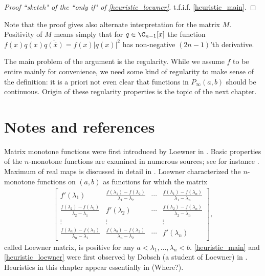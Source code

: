 \begin{proof}[Proof ``sketch" of the ``only if" of \ref{heuristic_loewner}]
	t.f.i.f. \ref{heuristic_main}.
\end{proof}

Note that the proof gives also alternate interpretation for the matrix $M$. Positivity of $M$ means simply that for $q \in \C_{n - 1}[x]$ the function $f(x) q(x) \overline{q(\overline{x})} = f(x) |q(x)|^2$ has non-negative $(2 n - 1)$'th derivative.

The main problem of the argument is the regularity. While we assume $f$ to be entire mainly for convenience, we need some kind of regularity to make sense of the definition: it is a priori not even clear that functions in $P_{\infty}(a, b)$ should be continuous. Origin of these regularity properties is the topic of the next chapter.

\section{Notes and references}

Matrix monotone functions were first introduced by Loewner in \cite{Low}. Basic properties of the $n$-monotone functions are examined in numerous sources; see for instance \cite{Hiai}. Maximum of real maps is discussed in detail in \cite{Ando2}. Loewner characterized the $n$-monotone functions on $(a, b)$ as functions for which the matrix
\begin{align*}
	\begin{bmatrix}
		f'(\lambda_{1}) & \frac{f(\lambda_{1}) - f(\lambda_{2})}{\lambda_{1} - \lambda_{2}} & \cdots & \frac{f(\lambda_{1}) - f(\lambda_{n})}{\lambda_{1} - \lambda_{n}} \\
		\frac{f(\lambda_{2}) - f(\lambda_{1})}{\lambda_{2} - \lambda_{1}} & f'(\lambda_{2}) & \cdots & \frac{f(\lambda_{2}) - f(\lambda_{n})}{\lambda_{2} - \lambda_{n}} \\
		\vdots & \vdots & & \vdots \\
		\frac{f(\lambda_{n}) - f(\lambda_{1})}{\lambda_{n} - \lambda_{1}} & \frac{f(\lambda_{b}) - f(\lambda_{2})}{\lambda_{n} - \lambda_{2}} & \cdots & f'(\lambda_{n}) 
	\end{bmatrix},
\end{align*}
called Loewner matrix, is positive for any $a < \lambda_{1}, \ldots, \lambda_{n} < b$. \ref{heuristic_main} and \ref{heuristic_loewner} were first observed by Dobsch (a student of Loewner) in \cite{Dob}. Heuristics in this chapter appear essentially in (Where?).



